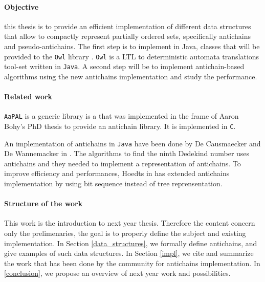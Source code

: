 \documentclass[letterpaper]{article}
\begin{document}
\paragraph{Objective}

this thesis is to provide an efficient implementation of different
data structures that allow to compactly
represent partially ordered sets, specifically antichains and pseudo-antichains.
The first step is to implement in Java, classes that will be provided to
the \texttt{Owl} library \cite{owl}.
\texttt{Owl} is a LTL to deterministic automata translations tool-set written
in \texttt{Java}. A second step will be to implement
antichain-based algorithms using the new antichains implementation and
study the performance.

\paragraph{Related work}



\texttt{AaPAL} is a generic
library is a that was implemented in the frame of
Aaron Bohy's PhD thesis \cite{bohy_phd}
to provide an antichain library. It is implemented in \texttt{C}.

An implementation of antichains in \texttt{Java} have been done
by De Causmaecker and De Wannemacker in \cite{causemaecker1}. The algorithms
to find the ninth Dedekind number uses antichains and they needed to
implement a representation of antichains.
To improve efficiency and performances, Hoedts in \cite{hoedt} has extended
\cite{causemaecker1} antichains implementation by using bit sequence
instead of tree reprensentation.


\paragraph{Structure of the work}

This work is the introduction to next year thesis. Therefore
the content concern only the prelimenaries, the goal is to
properly define the subject and existing implementation.
In Section \ref{data_structures}, we formally define antichains,
and give examples of such data structures. In Section \ref{impl},
we cite and summarize the work that has been done by the community
for antichains implementation. In \ref{conclusion}, we propose
an overview of next year work and possibilities.
\end{document}

